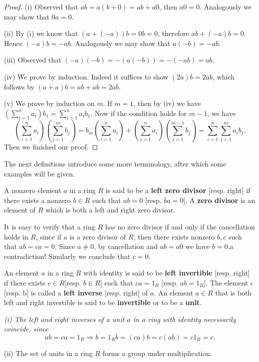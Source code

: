 \begin{proof}
(i) Observed that $ab=a(b+0)=ab+a0$, then $a0=0$. Analogously we may show that $0a=0$.\par
(ii) By (i) we know that $(a+(-a))b=0b=0$, therefore $ab+(-a)b=0$. Hence $(-a)b=-ab$. Analogously we may show that $a(-b)=-ab$.\par
(iii) Observed that $(-a)(-b)=-(a(-b))=-(-ab)=ab$.\par
(iv) We prove by induction. Indeed it suffices to show $(2a)b=2ab$, which follows by $(a+a)b=ab+ab=2ab$.\par
(v) We prove by induction on $m$. If $m=1$, then by (iv) we have $\left( \sum_{i=1}^n{a_i} \right) b_1=\sum_{i=1}^n{a_ib_1}$. Now if the condition holds for $m-1$, we have 
$$
\left( \sum_{i=1}^n{a_i} \right) \left( \sum_{j=1}^m{b_j} \right) =b_m\left( \sum_{i=1}^n{a_i} \right) +\left( \sum_{i=1}^n{a_i} \right) \left( \sum_{j=1}^{m-1}{b_j} \right) =\sum_{i=1}^n{\sum_{j=1}^m{a_ib_j}}.
$$
Then we finished our proof.
\end{proof}
The next definitions introduce some more terminology, after which some examples will be given.
\begin{definition}
A nonzero element $a$ in a ring $R$ is said to be a \textbf{left zero divisor} [resp. right] if there exists a nonzero $b\in R$ such that $ab=0$ [resp. $ba=0$]. A \textbf{zero divisor} is an element of $R$ which is both a left and right zero divisor.
\end{definition}
It is easy to verify that a ring $R$ has no zero divisor if and only if the cancellation holds in $R$, since if $a$ is a zero divisor of $R$, then there exists nonzero $b,c$ such that $ab=ca=0$. Since $a\ne 0$, by cancellation and $ab=a0$ we have $b=0$,a contradiction! Similarly we conclude that $c=0$.
\begin{definition}
An element $a$ in a ring $R$ with identity is said to be \textbf{left invertible} [resp. right] if there exists $c\in R$[resp. $b\in R$] such that $ca=1_R$ [resp. $ab=1_R$]. The element $c$ [resp. b] is called a \textbf{left inverse} [resp. right] of $a$. An element $a\in R$ that is both left and right invertible is said to be \textbf{invertible} or to be a \textbf{unit}.
\end{definition}
\begin{note}\em
(i) The left and right inverses of a unit $a$ in a ring with identity necessarily coincide, since 
$$
ab=ca=1_R\Rightarrow b=1_Rb=\left( ca \right) b=c\left( ab \right) =c1_R=c.
$$\par
(ii) The set of units in a ring $R$ forms a group under multiplication.
\end{note}
